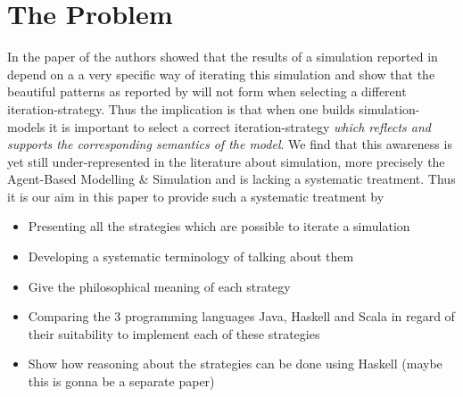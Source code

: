 \section{The Problem}
In the paper of \cite{huberman_evolutionary_1993} the authors showed that the results of a simulation reported in \cite{nowak_evolutionary_1992} depend on a a very specific way of iterating this simulation and show that the beautiful patterns as reported by \cite{nowak_evolutionary_1992} will not form when selecting a different iteration-strategy. Thus the implication is that when one builds simulation-models it is important to select a correct iteration-strategy \textit{which reflects and supports the corresponding semantics of the model}. We find that this awareness is yet still under-represented in the literature about simulation, more precisely the Agent-Based Modelling \& Simulation and is lacking a systematic treatment. Thus it is our aim in this paper to provide such a systematic treatment by
\begin{itemize}
	\item Presenting all the strategies which are possible to iterate a simulation 
	\item Developing a systematic terminology of talking about them
	\item Give the philosophical meaning of each strategy
	\item Comparing the 3 programming languages Java, Haskell and Scala in regard of their suitability to implement each of these strategies
	\item Show how reasoning about the strategies can be done using Haskell (maybe this is gonna be a separate paper)
\end{itemize}
